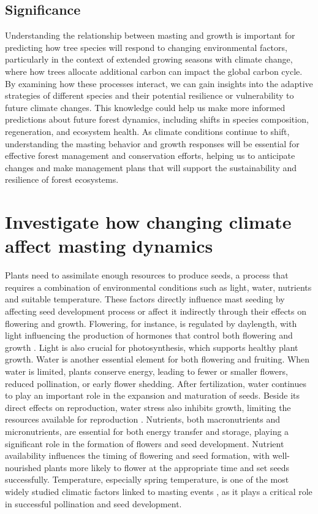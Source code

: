 \documentclass[11pt,letter]{article}
\begin{document}
\subsection{Significance}
Understanding the relationship between masting and growth is important for predicting how tree species will respond to changing environmental factors, particularly in the context of extended growing seasons with climate change, where how trees allocate additional carbon can impact the global carbon cycle. By examining how these processes interact, we can gain insights into the adaptive strategies of different species and their potential resilience or vulnerability to future climate changes. This knowledge could help us make more informed predictions about future forest dynamics, including shifts in species composition, regeneration, and ecosystem health. As climate conditions continue to shift, understanding the  masting behavior and growth responses will be essential for effective forest management and conservation efforts, helping us to anticipate changes and make management plans that will support the sustainability and resilience of forest ecosystems.\par

\section{Investigate how changing climate affect masting dynamics}
Plants need to assimilate enough resources to produce seeds, a process that requires a combination of environmental conditions such as light, water, nutrients and suitable temperature. These factors directly influence mast seeding by affecting seed development process or affect it indirectly through their effects on flowering and growth. Flowering, for instance, is regulated by daylength, with light influencing the production of hormones that control both flowering and growth \citep{lau2010plant}. Light is also crucial for photosynthesis, which supports healthy plant growth. Water is another essential element for both flowering and fruiting. When water is limited, plants conserve energy, leading to fewer or smaller flowers, reduced pollination, or early flower shedding. After fertilization, water continues to play an important role in the expansion and maturation of seeds. Beside its direct effects on reproduction, water stress also inhibits growth, limiting the resources available for reproduction \citep{hsiao1973plant, anjum2011morphological}. Nutrients, both macronutrients and micronutrients, are essential for both energy transfer and storage, playing a significant role in the formation of flowers and seed development. Nutrient availability influences the timing of flowering and seed formation, with well-nourished plants more likely to flower at the appropriate time and set seeds successfully. Temperature, especially spring temperature, is one of the most widely studied climatic factors linked to masting events \citep{bajocco2021characterizing, moreira2015effects, schauber2002masting, bogdziewicz2024evolutionary}, as it plays a critical role in successful pollination and seed development.\par
\end{document}
